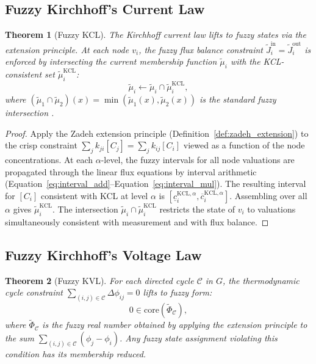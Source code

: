 \documentclass[twocolumn,10pt]{article}
\newtheorem{theorem}{Theorem}[section]
\theoremstyle{remark}
\newcommand{\fuzzyset}[1]{\tilde{\mu}_{#1}}
\newcommand{\eqnref}[1]{Equation~\ref{#1}}
\newcommand{\defref}[1]{Definition~\ref{#1}}
\begin{document}
\subsection{Fuzzy Kirchhoff's Current Law}

\begin{theorem}[Fuzzy KCL]
\label{thm:fuzzy_kcl}
The Kirchhoff current law lifts to fuzzy states via the extension principle.  At each node $v_i$, the fuzzy flux balance constraint $\tilde{J}_i^{\text{in}} = \tilde{J}_i^{\text{out}}$ is enforced by intersecting the current membership function $\fuzzyset{i}$ with the KCL-consistent set $\fuzzyset{i}^{\text{KCL}}$:
\begin{equation}
    \fuzzyset{i} \leftarrow \fuzzyset{i} \cap \fuzzyset{i}^{\text{KCL}},
    \label{eq:fuzzy_kcl}
\end{equation}
where $(\fuzzyset{1} \cap \fuzzyset{2})(x) = \min(\fuzzyset{1}(x), \fuzzyset{2}(x))$ is the standard fuzzy intersection \cite{zadeh1965}.
\end{theorem}

\begin{proof}
Apply the Zadeh extension principle (\defref{def:zadeh_extension}) to the crisp constraint $\sum_j k_{ji}[C_j] = \sum_j k_{ij}[C_i]$ viewed as a function of the node concentrations.  At each $\alpha$-level, the fuzzy intervals for all node valuations are propagated through the linear flux equations by interval arithmetic (\eqnref{eq:interval_add}--\eqnref{eq:interval_mul}).  The resulting interval for $[C_i]$ consistent with KCL at level $\alpha$ is $[\underline{c}_i^{\text{KCL},\alpha}, \overline{c}_i^{\text{KCL},\alpha}]$.  Assembling over all $\alpha$ gives $\fuzzyset{i}^{\text{KCL}}$.  The intersection $\fuzzyset{i} \cap \fuzzyset{i}^{\text{KCL}}$ restricts the state of $v_i$ to valuations simultaneously consistent with measurement and with flux balance.
\end{proof}

\subsection{Fuzzy Kirchhoff's Voltage Law}

\begin{theorem}[Fuzzy KVL]
\label{thm:fuzzy_kvl}
For each directed cycle $\mathcal{C}$ in $G$, the thermodynamic cycle constraint $\sum_{(i,j) \in \mathcal{C}} \Delta\phi_{ij} = 0$ lifts to fuzzy form:
\begin{equation}
    0 \in \text{core}\!\left(\tilde{\Phi}_\mathcal{C}\right),
    \label{eq:fuzzy_kvl}
\end{equation}
where $\tilde{\Phi}_\mathcal{C}$ is the fuzzy real number obtained by applying the extension principle to the sum $\sum_{(i,j) \in \mathcal{C}} (\phi_j - \phi_i)$.  Any fuzzy state assignment violating this condition has its membership reduced.
\end{theorem}
\end{document}
